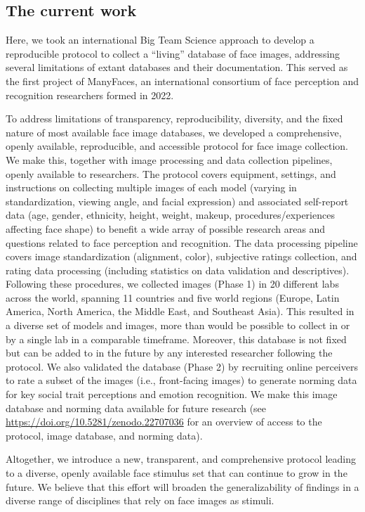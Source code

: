 \documentclass[
  letterpaper,
  DIV=11,
  numbers=noendperiod]{scrartcl}
\begin{document}
\subsection{The current work}\label{the-current-work}

Here, we took an international Big Team Science approach to develop a
reproducible protocol to collect a ``living'' database of face images,
addressing several limitations of extant databases and their
documentation. This served as the first project of ManyFaces, an
international consortium of face perception and recognition researchers
formed in 2022.

To address limitations of transparency, reproducibility, diversity, and
the fixed nature of most available face image databases, we developed a
comprehensive, openly available, reproducible, and accessible protocol
for face image collection. We make this, together with image processing
and data collection pipelines, openly available to researchers. The
protocol covers equipment, settings, and instructions on collecting
multiple images of each model (varying in standardization, viewing
angle, and facial expression) and associated self-report data (age,
gender, ethnicity, height, weight, makeup, procedures/experiences
affecting face shape) to benefit a wide array of possible research areas
and questions related to face perception and recognition. The data
processing pipeline covers image standardization (alignment, color),
subjective ratings collection, and rating data processing (including
statistics on data validation and descriptives). Following these
procedures, we collected images (Phase 1) in 20 different labs across
the world, spanning 11 countries and five world regions (Europe, Latin
America, North America, the Middle East, and Southeast Asia). This
resulted in a diverse set of models and images, more than would be
possible to collect in or by a single lab in a comparable timeframe.
Moreover, this database is not fixed but can be added to in the future
by any interested researcher following the protocol. We also validated
the database (Phase 2) by recruiting online perceivers to rate a subset
of the images (i.e., front-facing images) to generate norming data for
key social trait perceptions and emotion recognition. We make this image
database and norming data available for future research (see
\url{https://doi.org/10.5281/zenodo.22707036} for an overview of access
to the protocol, image database, and norming data).

Altogether, we introduce a new, transparent, and comprehensive protocol
leading to a diverse, openly available face stimulus set that can
continue to grow in the future. We believe that this effort will broaden
the generalizability of findings in a diverse range of disciplines that
rely on face images as stimuli.
\end{document}
